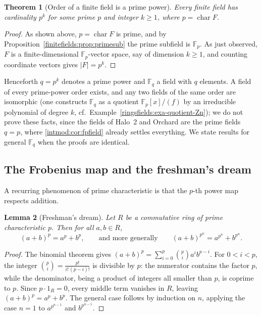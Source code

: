 \documentclass[11pt,a4paper]{article}
\newtheorem{theorem}{Theorem}[section]
\newtheorem{lemma}[theorem]{Lemma}
\theoremstyle{definition}
\theoremstyle{remark}
\newcommand{\Fp}{\ensuremath{\mathbb{F}_{p}}}
\newcommand{\Fq}{\ensuremath{\mathbb{F}_{q}}}
\begin{document}
\begin{theorem}[Order of a finite field is a prime power]
\label{finitefields:thm:primepower}
Every finite field has cardinality \(p^k\) for some prime \(p\) and integer \(k \ge 1\), where \(p = \operatorname{char} F\).
\end{theorem}

\begin{proof}
As shown above, \(p = \operatorname{char} F\) is prime, and by Proposition~\ref{finitefields:prop:primesub} the prime subfield is \(\Fp\). As just observed, \(F\) is a finite-dimensional \(\Fp\)-vector space, say of dimension \(k \ge 1\), and counting coordinate vectors gives \(|F| = p^k\).
\end{proof}

Henceforth \(q = p^k\) denotes a prime power and \(\Fq\) a field with \(q\) elements. A field of every prime-power order exists, and any two fields of the same order are isomorphic (one constructs \(\Fq\) as a quotient \(\Fp[x]/(f)\) by an irreducible polynomial of degree \(k\), cf.\ Example~\ref{ringsfields:exa-quotient-Zn}); we do not prove these facts, since the fields of Halo~2 and Orchard are the prime fields \(q = p\), where \cref{intmod:cor:fpfield} already settles everything. We state results for general \(\Fq\) when the proofs are identical.

\subsection{The Frobenius map and the freshman's dream}
\label{finitefields:subsec:frobenius}

A recurring phenomenon of prime characteristic is that the \(p\)-th power map respects addition.

\begin{lemma}[Freshman's dream]
\label{finitefields:lem:freshman}
Let \(R\) be a commutative ring of prime characteristic \(p\). Then for all \(a, b \in R\),
\[
  (a + b)^p = a^p + b^p,
  \qquad\text{and more generally}\qquad
  (a + b)^{p^n} = a^{p^n} + b^{p^n}.
\]
\end{lemma}

\begin{proof}
The binomial theorem gives \((a+b)^p = \sum_{i=0}^{p} \binom{p}{i} a^i b^{p-i}\). For \(0 < i < p\), the integer \(\binom{p}{i} = \frac{p!}{i!\,(p-i)!}\) is divisible by \(p\): the numerator contains the factor \(p\), while the denominator, being a product of integers all smaller than \(p\), is coprime to \(p\). Since \(p \cdot 1_R = 0\), every middle term vanishes in \(R\), leaving \((a+b)^p = a^p + b^p\). The general case follows by induction on \(n\), applying the case \(n=1\) to \(a^{p^{n-1}}\) and \(b^{p^{n-1}}\).
\end{proof}
\end{document}
